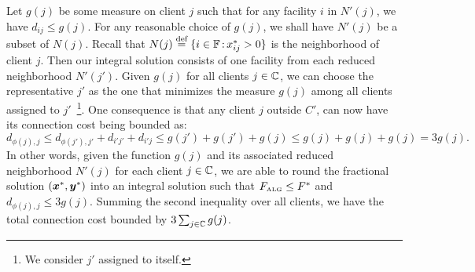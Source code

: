 \documentclass[oneside,final]{ucr}
\begin{document}
Let $g(j)$ be some measure on client $j$ such that for any
facility $i$ in $N'(j)$, we have $d_{ij} \leq g(j)$. For any
reasonable choice of $g(j)$, we shall have $N'(j)$ be a
subset of $N(j)$. Recall that $N(j) \stackrel{\text{def}}{=} \{i\in\mathbb{F}
{\,:\,} x_{ij}^\ast > 0\}$ is the neighborhood of client
$j$. Then our integral solution consists of one facility
from each reduced neighborhood $N'(j')$. Given $g(j)$ for
all clients $j\in\mathbb{C}$, we can choose the
representative $j'$ as the one that minimizes the measure
$g(j)$ among all clients assigned to $j'$~\footnote{We
  consider $j'$ assigned to itself.}. One consequence is
that any client $j$ outside $C'$, can now have its
connection cost being bounded as:
\begin{equation*}
  d_{\phi(j), j} \leq d_{\phi(j'), j'} + d_{i'j'} + d_{i'j}
  \leq g(j') + g(j') + g(j) \leq g(j) + g(j) + g(j) = 3g(j).
\end{equation*}
In other words, given the function $g(j)$ and its associated
reduced neighborhood $N'(j)$ for each client $j\in
\mathbb{C}$, we are able to round the fractional solution
$(\boldsymbol{x}^\ast, \boldsymbol{y}^\ast)$ into an integral solution such that
$F_{\mbox{\tiny\rm ALG}} \leq F^\ast$ and $d_{\phi(j), j} \leq 3
g(j)$. Summing the second inequality over all clients, we
have the total connection cost bounded by
$3\sum_{j\in\mathbb{C}} g(j)$.
\end{document}
